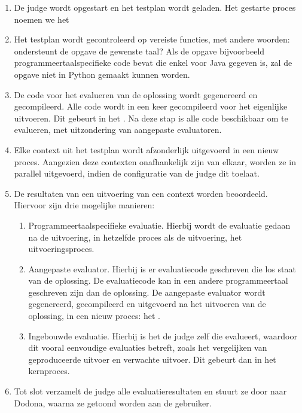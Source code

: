 \begin{enumerate}
    \item De judge wordt opgestart en het testplan wordt geladen.
    Het gestarte proces noemen we het 
    \item Het testplan wordt gecontroleerd op vereiste functies, met andere woorden: ondersteunt de opgave de gewenste taal?
    Als de opgave bijvoorbeeld programmeertaalspecifieke code bevat die enkel voor Java gegeven is, zal de opgave niet in Python gemaakt kunnen worden.
    \item De code voor het evalueren van de oplossing wordt gegenereerd en gecompileerd.
    Alle code wordt in een keer gecompileerd voor het eigenlijke uitvoeren.
    Dit gebeurt in het .
    Na deze stap is alle code beschikbaar om te evalueren, met uitzondering van aangepaste evaluatoren.
    \item Elke context uit het testplan wordt afzonderlijk uitgevoerd in een nieuw proces.
    Aangezien deze contexten onafhankelijk zijn van elkaar, worden ze in parallel uitgevoerd, indien de configuratie van de judge dit toelaat.
    \item De resultaten van een uitvoering van een context worden beoordeeld.
    Hiervoor zijn drie mogelijke manieren:
    \begin{enumerate}
        \item Programmeertaalspecifieke evaluatie.
        Hierbij wordt de evaluatie gedaan na de uitvoering, in hetzelfde proces als de uitvoering, het uitvoeringsproces.
        \item Aangepaste evaluator.
        Hierbij is er evaluatiecode geschreven die los staat van de oplossing.
        De evaluatiecode kan in een andere programmeertaal geschreven zijn dan de oplossing.
        De aangepaste evaluator wordt gegenereerd, gecompileerd en uitgevoerd na het uitvoeren van de oplossing, in een nieuw proces: het .
        \item Ingebouwde evaluatie.
        Hierbij is het de judge zelf die evalueert, waardoor dit vooral eenvoudige evaluaties betreft, zoals het vergelijken van geproduceerde uitvoer en verwachte uitvoer.
        Dit gebeurt dan in het kernproces.
    \end{enumerate}
    \item Tot slot verzamelt de judge alle evaluatieresultaten en stuurt ze door naar Dodona, waarna ze getoond worden aan de gebruiker.
\end{enumerate}


